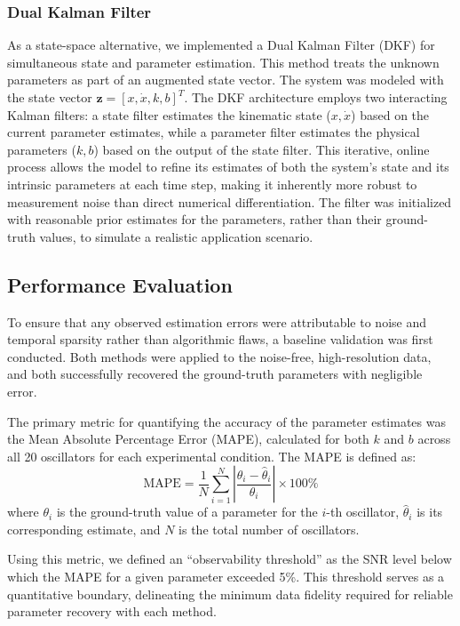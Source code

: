 \documentclass[]{article}
\begin{document}
\subsubsection{Dual Kalman Filter}
As a state-space alternative, we implemented a Dual Kalman Filter (DKF) for simultaneous state and parameter estimation. This method treats the unknown parameters as part of an augmented state vector. The system was modeled with the state vector $\mathbf{z} = [x, \dot{x}, k, b]^T$. The DKF architecture employs two interacting Kalman filters: a state filter estimates the kinematic state ($x, \dot{x}$) based on the current parameter estimates, while a parameter filter estimates the physical parameters ($k, b$) based on the output of the state filter. This iterative, online process allows the model to refine its estimates of both the system's state and its intrinsic parameters at each time step, making it inherently more robust to measurement noise than direct numerical differentiation. The filter was initialized with reasonable prior estimates for the parameters, rather than their ground-truth values, to simulate a realistic application scenario.

\subsection{Performance Evaluation}
To ensure that any observed estimation errors were attributable to noise and temporal sparsity rather than algorithmic flaws, a baseline validation was first conducted. Both methods were applied to the noise-free, high-resolution data, and both successfully recovered the ground-truth parameters with negligible error.

The primary metric for quantifying the accuracy of the parameter estimates was the Mean Absolute Percentage Error (MAPE), calculated for both $k$ and $b$ across all 20 oscillators for each experimental condition. The MAPE is defined as:
\begin{equation}
\text{MAPE} = \frac{1}{N} \sum_{i=1}^{N} \left| \frac{\theta_i - \hat{\theta}_i}{\theta_i} \right| \times 100\%
\end{equation}
where $\theta_i$ is the ground-truth value of a parameter for the $i$-th oscillator, $\hat{\theta}_i$ is its corresponding estimate, and $N$ is the total number of oscillators.

Using this metric, we defined an ``observability threshold'' as the SNR level below which the MAPE for a given parameter exceeded 5\%. This threshold serves as a quantitative boundary, delineating the minimum data fidelity required for reliable parameter recovery with each method.
\end{document}
